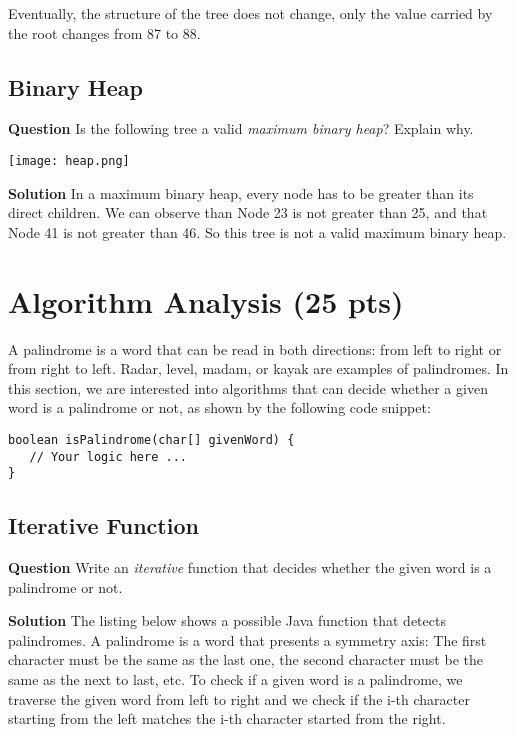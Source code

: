\documentclass[11pt]{article}
\begin{document}
Eventually, the structure of the tree does not change, only the value
carried by the root changes from 87 to 88.

\subsection{Binary Heap}
\label{sec:org112db0a}
\textbf{Question} Is the following tree a valid \emph{maximum binary heap}?
Explain why.

\begin{center}
\texttt{[image: heap.png]}
\end{center}

\textbf{Solution} In a maximum binary heap, every node has to be greater than
its direct children. We can observe than Node 23 is not greater than
25, and that Node 41 is not greater than 46. So this tree is not a
valid maximum binary heap.


\section{Algorithm Analysis (25 pts)}
\label{sec:orgdf18796}

A palindrome is a word that can be read in both directions: from
left to right or from right to left. Radar, level, madam, or kayak
are examples of palindromes. In this section, we are interested into
algorithms that can decide whether a given word is a palindrome or
not, as shown by the following code snippet:

\begin{verbatim}
boolean isPalindrome(char[] givenWord) {
   // Your logic here ...
}
\end{verbatim}

\subsection{Iterative Function}
\label{sec:org96be150}

\textbf{Question} Write an \emph{iterative} function that decides whether the
   given word is a palindrome or not.

\textbf{Solution} The listing below shows a possible Java function that
detects palindromes. A palindrome is a word that presents a
symmetry axis: The first character must be the same as the last one,
the second character must be the same as the next to last, etc. To
check if a given word is a palindrome, we traverse the given word
from left to right and we check if the i-th character starting from
the left matches the i-th character started from the right.
\end{document}
